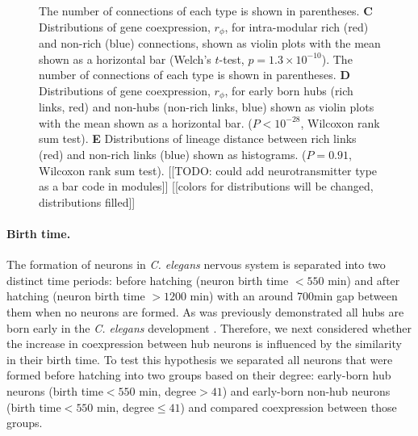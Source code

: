 \documentclass[10pt,letterpaper]{article}
\begin{document}
\begin{figure}[!h]
{The number of connections of each type is shown in parentheses.
\textbf{C} Distributions of gene coexpression, $r_\phi$, for intra-modular rich (red) and non-rich (blue) connections, shown as violin plots with the mean shown as a horizontal bar (Welch's $t$-test, $p = 1.3\times 10^{-10}$).
The number of connections of each type is shown in parentheses.
\textbf{D} Distributions of gene coexpression, $r_\phi$, for early born hubs (rich links, red) and non-hubs (non-rich links, blue) shown as violin plots with the mean shown as a horizontal bar. ($P < 10^{-28}$, Wilcoxon rank sum test).
\textbf{E} Distributions of lineage distance between rich links (red) and non-rich links (blue) shown as histograms. ($P = 0.91$, Wilcoxon rank sum test).
[[TODO: could add neurotransmitter type as a bar code in modules]]
[[colors for distributions will be changed, distributions filled]]
}
 \label{fig:OtherInfluences}
\end{figure}


\paragraph{Birth time.}
The formation of neurons in \textit{C. elegans} nervous system is separated into two distinct time periods: before hatching (neuron birth time $< 550$ min) and after hatching (neuron birth time $> 1200$ min) with an around 700min gap between them when no neurons are formed.  
As was previously demonstrated all hubs are born early in the \textit{C. elegans} development \cite{Varier2011,Towlson2013}. 
Therefore, we next considered whether the increase in coexpression between hub neurons is influenced by the similarity in their birth time. 
To test this hypothesis we separated all neurons that were formed before hatching into two groups based on their degree: early-born hub neurons (birth time$<550$ min, degree$>41$) and early-born non-hub neurons (birth time$<550$ min, degree$\leq41$) and compared coexpression between those groups. 
\end{document}
